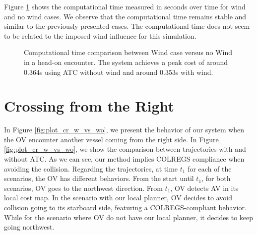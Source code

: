         Figure \ref{fig:plot_ho_w_vs_wind_CT} shows the computational time measured in seconds over time for wind and no wind cases. We observe that the computational time remains stable and similar to the previously presented cases. The computational time does not seem to be related to the imposed wind influence for this simulation.
        \begin{figure}[H]
            \centering
            
            \caption{Computational time comparison between Wind case versus no Wind in a head-on encounter. The system achieves a peak cost of around 0.364s using \ac{ATC} without wind and around 0.353s with wind.}
            \label{fig:plot_ho_w_vs_wind_CT}
        \end{figure}

        \section{Crossing from the Right}
        
        In Figure \ref{fig:plot_cr_w_vs_wo}, we present the behavior of our system when the \ac{OV} encounter another vessel coming from the right side. In Figure \ref{fig:plot_cr_w_vs_wo}, we show the comparison between trajectories with and without \ac{ATC}. As we can see, our method implies \ac{COLREGS} compliance when avoiding the collision. Regarding the trajectories, at time $t_1$ for each of the scenarios, the \ac{OV} has different behaviors. From the start until $t_1$, for both scenarios, \ac{OV} goes to the northwest direction. From $t_1$, \ac{OV} detects \ac{AV} in its local cost map. In the scenario with our local planner, \ac{OV} decides to avoid collision going to its starboard side, featuring a \ac{COLREGS}-compliant behavior. While for the scenario where \ac{OV} do not have our local planner, it decides to keep going northwest.
        

